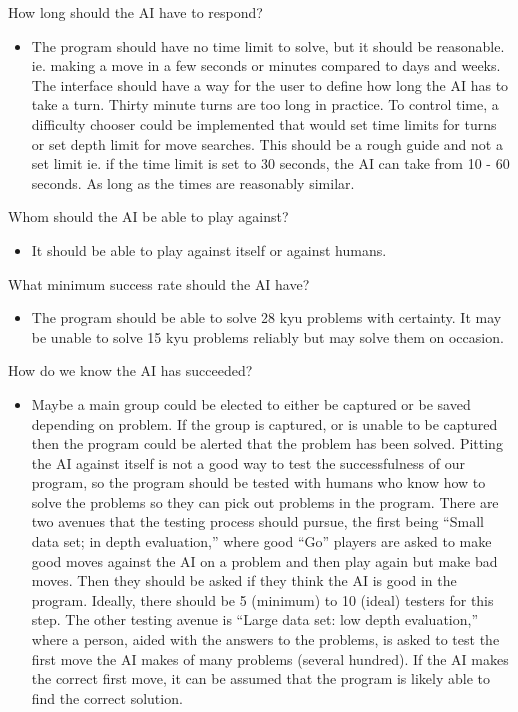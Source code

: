 \documentclass{l3proj}
\begin{document}
How long should the AI have to respond?
\begin{itemize}
\item The program should have no time limit to solve, but it should be reasonable. ie. making a move in a few seconds or minutes compared to days and weeks.  The interface should have a way for the user to define how long the AI has to take a turn.  Thirty minute turns are too long in practice.  To control time, a difficulty chooser could be implemented that would set time limits for turns or set depth limit for move searches.  This should be a rough guide and not a set limit ie. if the time limit is set to 30 seconds, the AI can take from 10 - 60 seconds. As long as the times are reasonably similar.
\end{itemize}
Whom should the AI be able to play against?
\begin{itemize}
\item It should be able to play against itself or against humans.
\end{itemize}
What minimum success rate should the AI have?
\begin{itemize}
\item The program should be able to solve 28 kyu problems with certainty.  It may be unable to solve 15 kyu problems reliably but may solve them on occasion.
\end{itemize}
How do we know the AI has succeeded?
\begin{itemize}
\item Maybe a main group could be elected to either be captured or be saved depending on problem.  If the group is captured, or is unable to be captured then the program could be alerted that the problem has been solved.  Pitting the AI against itself is not a good way to test the successfulness of our program, so the program should be tested with humans who know how to solve the problems so they can pick out problems in the program. There are two avenues that the testing process should pursue, the first being “Small data set; in depth evaluation,” where good “Go” players are asked to make good moves against the AI on a problem and then play again but make bad moves. Then they should be asked if they think the AI is good in the program.  Ideally, there should be 5 (minimum) to 10 (ideal) testers for this step.  The other testing avenue is “Large data set: low depth evaluation,” where a person, aided with the answers to the problems, is asked to test the first move the AI makes of many problems (several hundred). If the AI makes the correct first move, it can be assumed that the program is likely able to find the correct solution.
\end{itemize}
\end{document}
